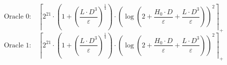 \[\text{Oracle 0:}\quad \left\lceil 2^{21} \cdot \left(1 + \left(\frac{L \cdot D^{3}}{\varepsilon}\right)^{\frac{1}{4}}\right) \cdot \left(\log\left(2 + \frac{H_0 \cdot D}{\varepsilon} + \frac{L \cdot D^{3}}{\varepsilon}\right)\right)^{2} \right\rceil_{+}\]
\[\text{Oracle 1:}\quad \left\lceil 2^{21} \cdot \left(1 + \left(\frac{L \cdot D^{3}}{\varepsilon}\right)^{\frac{1}{4}}\right) \cdot \left(\log\left(2 + \frac{H_0 \cdot D}{\varepsilon} + \frac{L \cdot D^{3}}{\varepsilon}\right)\right)^{2} \right\rceil_{+}\]
